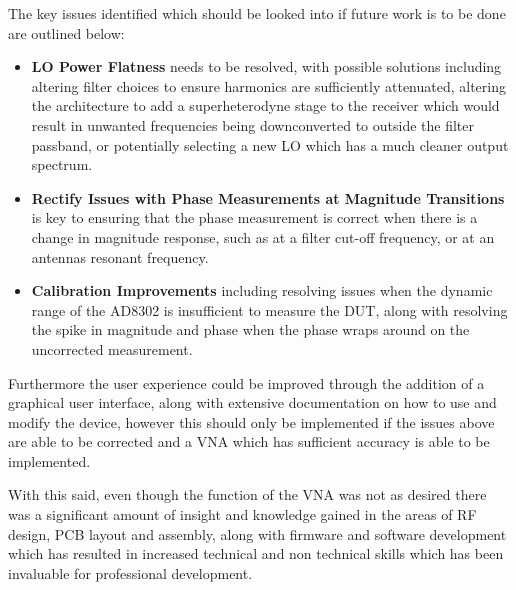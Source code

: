 The key issues identified which should be looked into if future work is to be done are outlined below: 
\begin{itemize}
	\item \textbf{LO Power Flatness} needs to be resolved, with possible solutions including altering filter choices to ensure harmonics are sufficiently attenuated, altering the architecture to add a superheterodyne stage to the receiver which would result in unwanted frequencies being downconverted to outside the filter passband, or potentially selecting a new LO which has a much cleaner output spectrum.
	\item \textbf{Rectify Issues with Phase Measurements at Magnitude Transitions} is key to ensuring that the phase measurement is correct when there is a change in magnitude response, such as at a filter cut-off frequency, or at an antennas resonant frequency. 
	\item \textbf{Calibration Improvements} including resolving issues when the dynamic range of the AD8302 is insufficient to measure the DUT, along with resolving the spike in magnitude and phase when the phase wraps around on the uncorrected measurement. 
\end{itemize}
Furthermore the user experience could be improved through the addition of a graphical user interface, along with extensive documentation on how to use and modify the device, however this should only be implemented if the issues above are able to be corrected and a VNA which has sufficient accuracy is able to be implemented. 

With this said, even though the function of the VNA was not as desired there was a significant amount of insight and knowledge gained in the areas of RF design, PCB layout and assembly, along with firmware and software development which has resulted in increased technical and non technical skills which has been invaluable for professional development. 